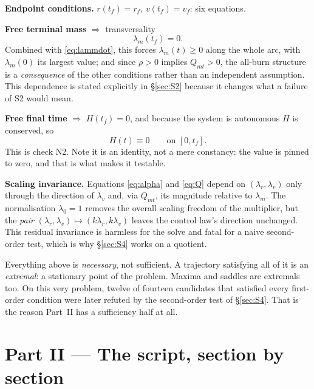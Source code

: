 \documentclass[11pt]{article}
\newcommand{\lv}{\lambda_v}\newcommand{\lr}{\lambda_r}\newcommand{\lm}{\lambda_m}
\newcommand{\tf}{t_f}\newcommand{\R}{\mathbb{R}}
\newcommand{\Qmt}{Q_{mt}}
\begin{document}
\begin{rig}
\textbf{Endpoint conditions.} $r(\tf) = r_f$, $v(\tf) = v_f$: six equations.

\textbf{Free terminal mass} $\Rightarrow$ transversality
\begin{equation}\label{eq:transv}
\lm(\tf) = 0.
\end{equation}
Combined with \eqref{eq:lammdot}, this forces $\lm(t) \ge 0$ along the whole
arc, with $\lm(0)$ its largest value; and since $\rho > 0$ implies $\Qmt > 0$,
the all-burn structure is a \emph{consequence} of the other conditions rather
than an independent assumption. This dependence is stated explicitly in
\S\ref{sec:S2} because it changes what a failure of S2 would mean.

\textbf{Free final time} $\Rightarrow$ $H(\tf) = 0$, and because the system is
autonomous $H$ is conserved, so
\begin{equation}\label{eq:Hzero}
H(t) \equiv 0 \qquad \text{on } [0, \tf].
\end{equation}
This is check N2. Note it is an identity, not a mere constancy: the value is
pinned to zero, and that is what makes it testable.

\textbf{Scaling invariance.} Equations \eqref{eq:alpha} and \eqref{eq:Q} depend
on $(\lr, \lv)$ only through the direction of $\lv$ and, via $\Qmt$, its
magnitude relative to $\lm$. The normalisation $\lambda_0 = 1$ removes the
overall scaling freedom of the multiplier, but the \emph{pair}
$(\lr, \lv) \mapsto (k\lr, k\lv)$ leaves the control law's direction
unchanged. This residual invariance is harmless for the solve and fatal for a
naive second-order test, which is why \S\ref{sec:S4} works on a quotient.
\end{rig}

\begin{warn}
Everything above is \emph{necessary}, not sufficient. A trajectory satisfying
all of it is an \emph{extremal}: a stationary point of the problem. Maxima and
saddles are extremals too. On this very problem, twelve of fourteen candidates
that satisfied every first-order condition were later refuted by the
second-order test of \S\ref{sec:S4}. That is the reason Part~II has a
sufficiency half at all.
\end{warn}

\part*{Part II --- The script, section by section}
\end{document}
